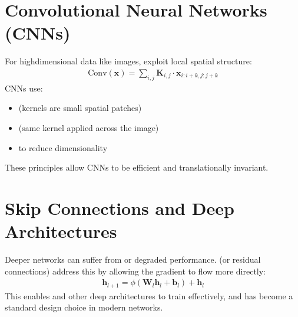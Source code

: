 \documentclass[letterpaper,10pt,english]{jupyterBook}
\begin{document}
\section{Convolutional Neural Networks (CNNs)}
\label{\detokenize{neuralnets_architecture:convolutional-neural-networks-cnns}}
\sphinxAtStartPar
For high\sphinxhyphen{}dimensional data like images,  exploit local spatial structure:
\begin{equation*}
\begin{split}
\text{Conv}(\mathbf{x}) = \sum_{i,j} \mathbf{K}_{i,j} \cdot \mathbf{x}_{i:i+k, j:j+k}
\end{split}
\end{equation*}
\sphinxAtStartPar
CNNs use:
\begin{itemize}
\item {} 
\sphinxAtStartPar
{} (kernels are small spatial patches)

\item {} 
\sphinxAtStartPar
{} (same kernel applied across the image)

\item {} 
\sphinxAtStartPar
{} to reduce dimensionality

\end{itemize}

\sphinxAtStartPar
These principles allow CNNs to be efficient and translationally invariant.


\section{Skip Connections and Deep Architectures}
\label{\detokenize{neuralnets_architecture:skip-connections-and-deep-architectures}}
\sphinxAtStartPar
Deeper networks can suffer from  or degraded performance.  (or residual connections) address this by allowing the gradient to flow more directly:
\begin{equation*}
\begin{split}
\mathbf{h}_{l+1} = \phi(\mathbf{W}_l \mathbf{h}_l + \mathbf{b}_l) + \mathbf{h}_l
\end{split}
\end{equation*}
\sphinxAtStartPar
This enables  and other deep architectures to train effectively, and has become a standard design choice in modern networks.
\end{document}
